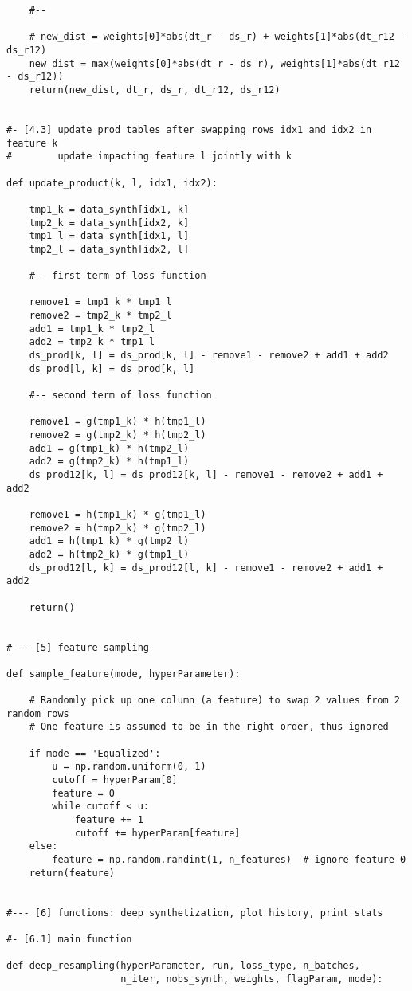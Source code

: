 \documentclass[oneside,10pt]{book}
\begin{document}
\begin{lstlisting}
    #--

    # new_dist = weights[0]*abs(dt_r - ds_r) + weights[1]*abs(dt_r12 - ds_r12)   
    new_dist = max(weights[0]*abs(dt_r - ds_r), weights[1]*abs(dt_r12 - ds_r12)) 
    return(new_dist, dt_r, ds_r, dt_r12, ds_r12)


#- [4.3] update prod tables after swapping rows idx1 and idx2 in feature k
#        update impacting feature l jointly with k

def update_product(k, l, idx1, idx2):  
    
    tmp1_k = data_synth[idx1, k]
    tmp2_k = data_synth[idx2, k]
    tmp1_l = data_synth[idx1, l]
    tmp2_l = data_synth[idx2, l]

    #-- first term of loss function

    remove1 = tmp1_k * tmp1_l
    remove2 = tmp2_k * tmp2_l
    add1 = tmp1_k * tmp2_l
    add2 = tmp2_k * tmp1_l
    ds_prod[k, l] = ds_prod[k, l] - remove1 - remove2 + add1 + add2
    ds_prod[l, k] = ds_prod[k, l] 

    #-- second term of loss function

    remove1 = g(tmp1_k) * h(tmp1_l)
    remove2 = g(tmp2_k) * h(tmp2_l)
    add1 = g(tmp1_k) * h(tmp2_l)
    add2 = g(tmp2_k) * h(tmp1_l)
    ds_prod12[k, l] = ds_prod12[k, l] - remove1 - remove2 + add1 + add2

    remove1 = h(tmp1_k) * g(tmp1_l)
    remove2 = h(tmp2_k) * g(tmp2_l)
    add1 = h(tmp1_k) * g(tmp2_l)
    add2 = h(tmp2_k) * g(tmp1_l)
    ds_prod12[l, k] = ds_prod12[l, k] - remove1 - remove2 + add1 + add2

    return()


#--- [5] feature sampling 

def sample_feature(mode, hyperParameter):
    
    # Randomly pick up one column (a feature) to swap 2 values from 2 random rows 
    # One feature is assumed to be in the right order, thus ignored

    if mode == 'Equalized': 
        u = np.random.uniform(0, 1)
        cutoff = hyperParam[0]
        feature = 0
        while cutoff < u:
            feature += 1
            cutoff += hyperParam[feature]
    else:
        feature = np.random.randint(1, n_features)  # ignore feature 0
    return(feature)


#--- [6] functions: deep synthetization, plot history, print stats 

#- [6.1] main function
 
def deep_resampling(hyperParameter, run, loss_type, n_batches, 
                    n_iter, nobs_synth, weights, flagParam, mode):
  

\end{lstlisting}
\end{document}
